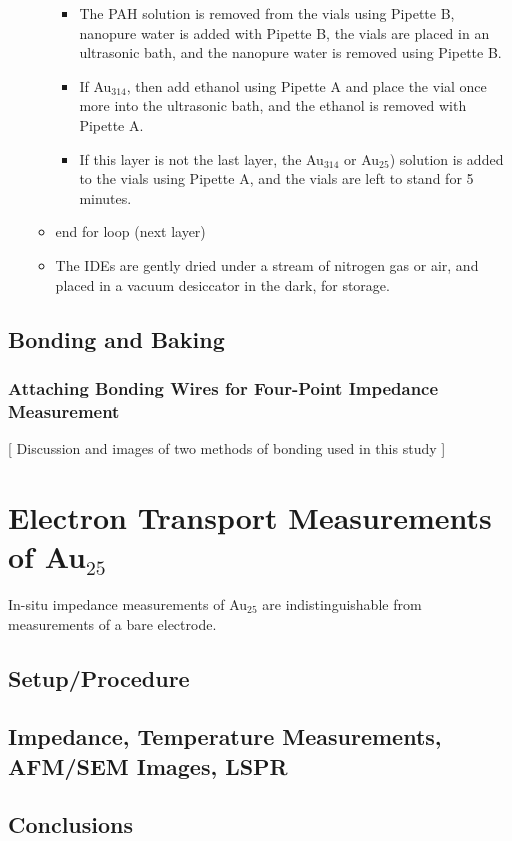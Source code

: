 \documentclass[12pt,oneside,english]{article}
\begin{document}
\begin{itemize}
\begin{itemize}
\begin{itemize}
				\item The PAH solution is removed from the vials using Pipette B,  nanopure water is added with Pipette B, the vials are placed in an ultrasonic bath, and the nanopure water is removed using Pipette B.
				\item If Au$_{314}$, then add ethanol using Pipette A and place the vial once more into the ultrasonic bath, and the ethanol is removed with Pipette A.
				\item If this layer is not the last layer, the Au$_{314}$ or Au$_{25}$) solution is added to the vials using Pipette A, and the vials are left to stand for 5 minutes.
			\end{itemize}
			\item end for loop (next layer)
			\item The IDEs are gently dried under a stream of nitrogen gas or air, and placed in a vacuum desiccator in the dark, for storage.
		\end{itemize}
	\end{itemize}

	\subsection{Bonding and Baking}
	
	\subsubsection{Attaching Bonding Wires for Four-Point Impedance Measurement}
	[ Discussion and images of two methods of bonding used in this study ]
	
	
	\section{Electron Transport Measurements of Au$_{25}$}
	In-situ impedance measurements of Au$_{25}$ are indistinguishable from measurements of a bare electrode.
	\subsection{Setup/Procedure}
	
	\subsection{Impedance, Temperature Measurements, AFM/SEM Images, LSPR}
	\subsection{Conclusions}
\end{document}
